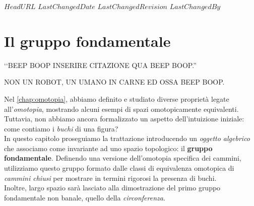 \svnidlong
{$HeadURL$}
{$LastChangedDate$}
{$LastChangedRevision$}
{$LastChangedBy$}

\chapter{Il gruppo fondamentale}

\begin{introduction}
	‘‘BEEP BOOP INSERIRE CITAZIONE QUA BEEP BOOP.''
	\begin{flushright}
		\textsc{NON UN ROBOT,} UN UMANO IN CARNE ED OSSA BEEP BOOP.
	\end{flushright}
\end{introduction}
\noindent Nel \autoref{chap:omotopia}, abbiamo definito e studiato diverse proprietà legate all'\textit{omotopia}, mostrando alcuni esempi di spazi omotopicamente equivalenti. Tuttavia, non abbiamo ancora formalizzato un aspetto dell'intuizione iniziale: come contiamo i \textit{buchi} di una figura?\\
In questo capitolo proseguiamo la trattazione introducendo un \textit{oggetto algebrico} che associamo come invariante ad uno spazio topologico: il \textbf{gruppo fondamentale}. Definendo una versione dell'omotopia specifica dei cammini, utilizziamo questo gruppo formato dalle classi di equivalenza omotopica di \textit{cammini chiusi} per mostrare in termini rigorosi la presenza di buchi.\\
Inoltre, largo spazio sarà lasciato alla dimostrazione del primo gruppo fondamentale non banale, quello della \textit{circonferenza}.
